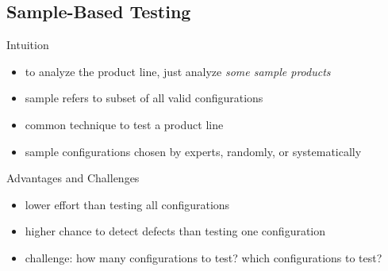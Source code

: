 \subsection{Sample-Based Testing}
\begin{frame}{\myframetitle}
	\begin{mycolumns}
		\begin{definition}{Intuition}
			\begin{itemize}
				\item to analyze the product line, just analyze \emph{some sample products}
				\item sample  refers to subset of all valid configurations
				\item common technique to test a product line
				\item sample configurations chosen by experts, randomly, or systematically
			\end{itemize}
		\end{definition}
		\begin{note}{Advantages and Challenges}
			\begin{itemize}
				\item lower effort than testing all configurations
				\item higher chance to detect defects than testing one configuration
				\item challenge: how many configurations to test? which configurations to test?
			\end{itemize}
		\end{note}
	\mynextcolumn
	\end{mycolumns}
\end{frame}





